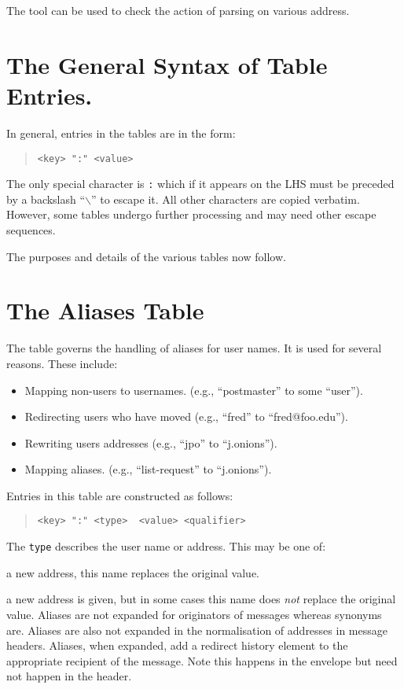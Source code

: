 The tool  can be used to check the action of parsing on
various address.

\section	{The General Syntax of Table Entries.}

In general, entries in the tables are in the form:
\begin{quote}\small\begin{verbatim}
<key> ":" <value>
\end{verbatim}\end{quote}
The only special character is \verb|:| which if it appears on the LHS
must be preceded by a backslash ``$\backslash$'' to escape it. All other
characters are copied verbatim. However, some tables undergo further
processing and may need other escape sequences.

The purposes and details of the various tables now follow.

\section {The Aliases Table}

The  table governs the handling of aliases for
user names. It is used for several reasons. These include:
\begin{itemize}
\item	Mapping non-users to usernames. (e.g., ``postmaster'' to some 
``user'').
\item	Redirecting users who have moved (e.g., ``fred'' to ``fred@foo.edu'').
\item	Rewriting users addresses (e.g., ``jpo'' to ``j.onions'').
\item	Mapping aliases. (e.g., ``list-request'' to ``j.onions'').
\end{itemize}
Entries in this table are constructed as follows:

\begin{quote}\begin{verbatim}
<key> ":" <type>  <value> <qualifier>
\end{verbatim}\end{quote}

The \verb+type+
describes the user name or address.  This may be one of:

\begin{describe}
\item[\verb+synonym+:]
a new address, this name replaces the original
value.
\item[\verb+alias+:]
a new address is given, but in some cases this name does {\em not}
replace the original value. Aliases are not expanded for originators
of messages whereas synonyms are. 
Aliases are also not expanded in the normalisation of addresses in
message headers.
Aliases, when expanded, add a redirect history element to the appropriate
recipient of the message.
Note this happens in the envelope but need not happen in the header.
\end{describe}

